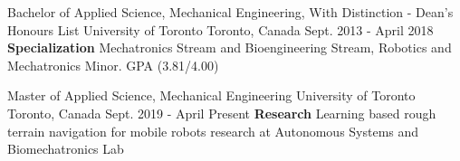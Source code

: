 \begin{cventries}
  \cventry
    {Bachelor of Applied Science, Mechanical Engineering, With Distinction - Dean's Honours List}
    {University of Toronto}
    {Toronto, Canada}
    {Sept. 2013 - April 2018}
    {
    \textbf{Specialization} Mechatronics Stream and Bioengineering Stream, Robotics and Mechatronics Minor. GPA (3.81/4.00)
    }

    \cventry
    {Master of Applied Science, Mechanical Engineering}
    {University of Toronto}
    {Toronto, Canada}
    {Sept. 2019 - April Present}
    {
    \textbf{Research} Learning based rough terrain navigation for mobile robots research at Autonomous Systems and Biomechatronics Lab
    }
\end{cventries}
